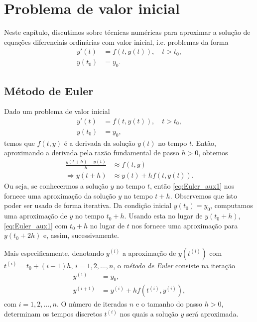 
\chapter{Problema de valor inicial}\label{cap_pvi}
\thispagestyle{fancy}

Neste capítulo, discutimos sobre técnicas numéricas para aproximar a solução de equações diferenciais ordinárias com valor inicial, i.e. problemas da forma
\begin{align}
  y'(t) &= f(t,y(t)),\quad t>t_0,\\
  y(t_0) &= y_0.
\end{align}

\section{Método de Euler}\label{cap_pvi_sec_Euler}

Dado um problema de valor inicial
\begin{align}
  y'(t) &= f(t,y(t)),\quad t>t_0,\label{eq:Euler_pvi_1}\\
  y(t_0) &= y_0,\label{eq:Euler_pvi_2}
\end{align}
temos que $f(t,y)$ é a derivada da solução $y(t)$ no tempo $t$. Então, aproximando a derivada pela razão fundamental de passo $h>0$, obtemos
\begin{align}
  \frac{y(t+h)-y(t)}{h} &\approx f(t,y) \\
  \Rightarrow y(t+h) &\approx y(t) + hf(t,y(t)).\label{eq:Euler_aux1}
\end{align}
Ou seja, se conhecermos a solução $y$ no tempo $t$, então \eqref{eq:Euler_aux1} nos fornece uma aproximação da solução $y$ no tempo $t+h$. Observemos que isto poder ser usado de forma iterativa. Da condição inicial $y(t_0)=y_0$, computamos uma aproximação de $y$ no tempo $t_0+h$. Usando esta no lugar de $y(t_0+h)$, \eqref{eq:Euler_aux1} com $t_0+h$ no lugar de $t$ nos fornece uma aproximação para $y(t_0+2h)$ e, assim, sucessivamente.

Mais especificamente, denotando $y^{(i)}$ a aproximação de $y(t^{(i)})$ com $t^{(i)}=t_0+(i-1)h$, $i=1, 2, \dotsc, n$, o \emph{método de Euler} consiste na iteração
\begin{align}
  y^{(1)} &= y_0,\label{eq:iter_Euler_1}\\
  y^{(i+1)} &= y^{(i)} + hf(t^{(i)},y^{(i)}),\label{eq:iter_Euler_2}
\end{align}
com $i=1, 2, \dotsc, n$. O número de iteradas $n$ e o tamanho do passo $h>0$, determinam os tempos discretos $t^{(i)}$ nos quais a solução $y$ será aproximada.

